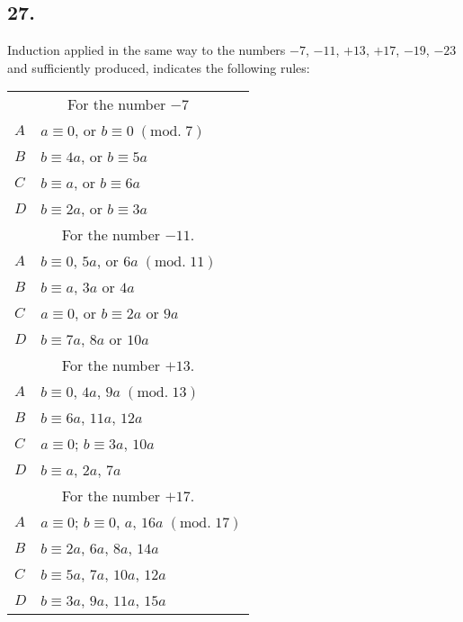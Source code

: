 \documentclass[twoside,12pt, showframe]{memoir}
\renewcommand{\pmod}[1]{\;(\textrm{mod.}\;#1)}
\begin{document}
\subsection*{27.}

Induction applied in the same way to the numbers \(-7\), \(-11\), \(+13\), \(+17\), \(-19\), \(-23\) and sufficiently produced, indicates the following rules:
\begin{center}
\begin{tabular}{l|l}
\multicolumn{2}{c}{For the number \(-7\)}\\
\(A\) & \(a \equiv 0\), or \(b \equiv 0\pmod{7}\) \\
\(B\) & \(b \equiv 4 a\), or \(b \equiv 5 a\) \\
\(C\) & \(b \equiv a\), or \(b \equiv 6 a\) \\
\(D\) & \(b \equiv 2 a\), or \(b \equiv 3 a\) \\
\multicolumn{2}{c}{For the number \(-11\).}\\
\(A\) & \(b \equiv 0\), \(5 a\), or \(6 a\pmod{11}\) \\
\(B\) & \(b \equiv a\), \(3 a\) or \(4 a\) \\
\(C\) & \(a \equiv 0\), or \(b \equiv 2 a\) or \(9 a\) \\
\(D\) & \(b \equiv 7 a\), \(8 a\) or \(10 a\) \\
\multicolumn{2}{c}{For the number \(+13\).}\\
\(A\) & \(b \equiv 0\), \(4a\), \(9 a\pmod{13}\) \\
\(B\) & \(b \equiv 6 a\), \(11 a\), \(12 a\) \\
\(C\) & \(a \equiv 0\); \(b \equiv 3 a\), \(10 a\) \\
\(D\) & \(b \equiv a\), \(2 a\), \(7 a\) \\
\multicolumn{2}{c}{For the number \(+17\).}\\
\(A\) & \(a \equiv 0\); \(b \equiv 0\), \(a\), \(16 a\pmod{17}\)\\
\(B\) & \(b \equiv 2 a\), \(6 a\), \(8 a\), \(14 a\)\\
\(C\) & \(b \equiv 5 a\), \(7 a\), \(10 a\), \(12 a\)\\
\(D\) & \(b \equiv 3 a\), \(9 a\), \(11 a\), \(15 a\)
\end{tabular}
\end{center}\clearpage\noindent%
\end{document}
